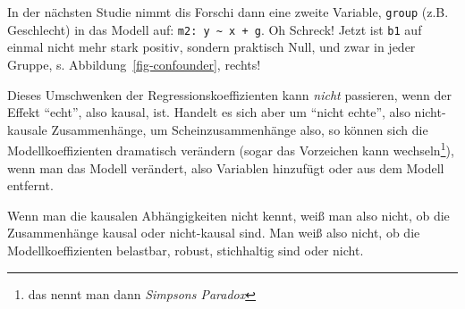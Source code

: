 \documentclass[
  letterpaper,
]{scrbook}
\theoremstyle{definition}
\theoremstyle{definition}
\theoremstyle{definition}
\theoremstyle{remark}
\begin{document}
In der nächsten Studie nimmt dis Forschi dann eine zweite Variable,
\texttt{group} (z.B. Geschlecht) in das Modell auf:
\texttt{m2:\ y\ \textasciitilde{}\ x\ +\ g}. Oh Schreck! Jetzt ist
\texttt{b1} auf einmal nicht mehr stark positiv, sondern praktisch Null,
und zwar in jeder Gruppe, s. Abbildung~\ref{fig-confounder}, rechts!

Dieses Umschwenken der Regressionskoeffizienten kann \emph{nicht}
passieren, wenn der Effekt ``echt'', also kausal, ist. Handelt es sich
aber um ``nicht echte'', also nicht-kausale Zusammenhänge, um
Scheinzusammenhänge also, so können sich die Modellkoeffizienten
dramatisch verändern (sogar das Vorzeichen kann wechseln\footnote{das
  nennt man dann \emph{Simpsons Paradox}}), wenn man das Modell
verändert, also Variablen hinzufügt oder aus dem Modell entfernt.

Wenn man die kausalen Abhängigkeiten nicht kennt, weiß man also nicht,
ob die Zusammenhänge kausal oder nicht-kausal sind. Man weiß also nicht,
ob die Modellkoeffizienten belastbar, robust, stichhaltig sind oder
nicht.
\end{document}
